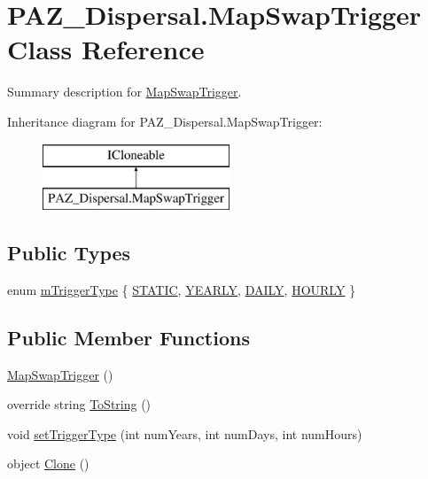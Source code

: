 \hypertarget{class_p_a_z___dispersal_1_1_map_swap_trigger}{\section{P\-A\-Z\-\_\-\-Dispersal.\-Map\-Swap\-Trigger Class Reference}
\label{class_p_a_z___dispersal_1_1_map_swap_trigger}
}


Summary description for \hyperlink{class_p_a_z___dispersal_1_1_map_swap_trigger}{Map\-Swap\-Trigger}.  


Inheritance diagram for P\-A\-Z\-\_\-\-Dispersal.\-Map\-Swap\-Trigger\-:\begin{figure}[H]
\begin{center}
\leavevmode
\includegraphics[height=2.000000cm]{class_p_a_z___dispersal_1_1_map_swap_trigger}
\end{center}
\end{figure}
\subsection*{Public Types}
\begin{DoxyCompactItemize}
\item 
enum \hyperlink{class_p_a_z___dispersal_1_1_map_swap_trigger_a3767a96c305890046812ada41c4fce00}{m\-Trigger\-Type} \{ \hyperlink{class_p_a_z___dispersal_1_1_map_swap_trigger_a3767a96c305890046812ada41c4fce00afe6f99ef1ec99efbdc19a9786cf1facc}{S\-T\-A\-T\-I\-C}, 
\hyperlink{class_p_a_z___dispersal_1_1_map_swap_trigger_a3767a96c305890046812ada41c4fce00ae50d62d1ede0a4ea1acb310ff6ca4d5b}{Y\-E\-A\-R\-L\-Y}, 
\hyperlink{class_p_a_z___dispersal_1_1_map_swap_trigger_a3767a96c305890046812ada41c4fce00a791490f9f4842958f00f3791f6c01576}{D\-A\-I\-L\-Y}, 
\hyperlink{class_p_a_z___dispersal_1_1_map_swap_trigger_a3767a96c305890046812ada41c4fce00abaf6ff95d32557260caa379339315a4e}{H\-O\-U\-R\-L\-Y}
 \}
\end{DoxyCompactItemize}
\subsection*{Public Member Functions}
\begin{DoxyCompactItemize}
\item 
\hyperlink{class_p_a_z___dispersal_1_1_map_swap_trigger_ae06899cf8aa148a9d042dedb56539932}{Map\-Swap\-Trigger} ()
\item 
override string \hyperlink{class_p_a_z___dispersal_1_1_map_swap_trigger_a80f878d993b7fc253e141fd575b31d1e}{To\-String} ()
\item 
void \hyperlink{class_p_a_z___dispersal_1_1_map_swap_trigger_aa5790f376123a8ff51144e156c119f7b}{set\-Trigger\-Type} (int num\-Years, int num\-Days, int num\-Hours)
\item 
object \hyperlink{class_p_a_z___dispersal_1_1_map_swap_trigger_a8049d9483e2eee1da64b8eb97ccd450a}{Clone} ()
\end{DoxyCompactItemize}
